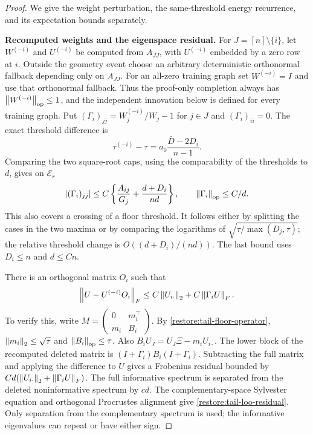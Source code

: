 \begin{proof}
We give the weight perturbation, the same-threshold energy recurrence,
and its expectation bounds separately.

\medskip\noindent\textbf{Recomputed weights and the eigenspace residual.}
For $J=[n]\setminus\{i\}$, let $W^{(-i)}$ and $U^{(-i)}$ be
computed from $A_{JJ}$, with $U^{(-i)}$ embedded by a zero row at $i$.
Outside the geometry event choose an arbitrary deterministic
orthonormal fallback depending only on $A_{JJ}$.
For an all-zero training graph set $W^{(-i)}=I$ and use that
orthonormal fallback. Thus the proof-only completion always has
$\left\lVert W^{(-i)}\right\rVert_{\mathrm{op}}\le1$, and the independent innovation below
is defined for every training graph.
Put $(\Gamma_i)_{jj}=W_j^{(-i)}/W_j-1$ for $j\in J$ and
$(\Gamma_i)_{ii}=0$.
The exact threshold difference is
\[
 \tau^{(-i)}-\tau
 =a_0\frac{\bar D-2D_i}{n-1}.
\]
Comparing the two square-root caps, using the comparability of the
thresholds to $d$, gives on $\mathcal E_r$
\begin{equation}
 |(\Gamma_i)_{jj}|
 \le C\left\{\frac{A_{ij}}{G_j}
             +\frac{d+D_i}{nd}\right\},
 \qquad \left\lVert\Gamma_i\right\rVert_{\mathrm{op}}\le C/d.
 \label{restore:tail-weight-change}
\end{equation}
This also covers a crossing of a floor threshold.  It follows either
by splitting the cases in the two maxima or by comparing the logarithms
of $\sqrt{\tau/\max(D_j,\tau)}$; the relative threshold change is
$O((d+D_i)/(nd))$.  The last bound uses $D_i\le n$ and $d\le Cn$.

There is an orthogonal matrix $O_i$ such that
\begin{equation}
 \left\lVert U-U^{(-i)}O_i\right\rVert_F
 \le C\left\lVert U_{i\cdot}\right\rVert_2+C\left\lVert\Gamma_iU\right\rVert_F.
 \label{restore:tail-loo-residual}
\end{equation}
To verify this, write
$M=\left(\begin{smallmatrix}0&m_i^\top\\m_i&B_i\end{smallmatrix}\right)$.
By \eqref{restore:tail-floor-operator},
$\left\lVert m_i\right\rVert_2\le\sqrt\tau$ and $\left\lVert B_i\right\rVert_{\mathrm{op}}\le\tau$.
Also $B_iU_J=U_J\Xi-m_iU_{i\cdot}$.
The lower block of the recomputed deleted matrix is
$(I+\Gamma_i)B_i(I+\Gamma_i)$.
Subtracting the full matrix and applying the difference to $U$ gives
a Frobenius residual bounded by
$Cd(\left\lVert U_{i\cdot}\right\rVert_2+\left\lVert\Gamma_iU\right\rVert_F)$.
The full informative spectrum is separated from the deleted
noninformative spectrum by $cd$.
The complementary-space Sylvester equation and orthogonal Procrustes
alignment give \eqref{restore:tail-loo-residual}.
Only separation from the complementary spectrum is used; the
informative eigenvalues can repeat or have either sign.


\end{proof}
